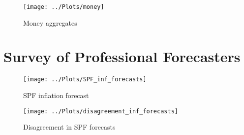 \documentclass{beamer}
\begin{document}
\begin{frame}
\begin{figure}
	\centering
	\texttt{[image: ../Plots/money]}
	\caption{Money aggregates}
\end{figure}
\end{frame}

\section{Survey of Professional Forecasters}
\begin{frame}
\begin{figure}
	\centering
	\texttt{[image: ../Plots/SPF\_inf\_forecasts]}
	\caption{SPF inflation forecast}
\end{figure}
\end{frame}


\begin{frame}
\begin{figure}
	\centering
	\texttt{[image: ../Plots/disagreement\_inf\_forecasts]}
	\caption{Disagreement in SPF forecasts}
\end{figure}
\end{frame}
\end{document}
